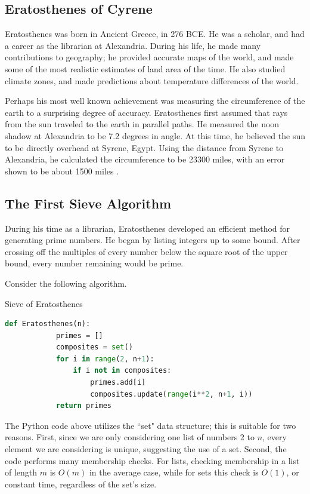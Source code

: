 \documentclass{amsart}
\theoremstyle{definition}
\theoremstyle{case}
\begin{document}
	\subsection{Eratosthenes of Cyrene}	
	Eratosthenes was born in Ancient Greece, in 276 BCE. He was a scholar, and had a career as the librarian at Alexandria. During his life, he made many contributions to geography; he provided accurate maps of the world, and made some of the most realistic estimates of land area of the time. He also studied climate zones, and made predictions about temperature differences of the world. 
	
	Perhaps his most well known achievement was measuring the circumference of the earth to a surprising degree of accuracy. Eratosthenes first assumed that rays from the sun traveled to the earth in parallel paths. He measured the noon shadow at Alexandria to be 7.2 degrees in angle. At this time, he believed the sun to be directly overhead at Syrene, Egypt. Using the distance from Syrene to Alexandria, he calculated the circumference to be 23300 miles, with an error shown to be about 1500 miles \cite{lawson2004}. 
	
	\subsection{The First Sieve Algorithm}
	
	During his time as a librarian, Eratosthenes developed an efficient method for generating prime numbers. He began by listing integers up to some bound. After crossing off the multiples of every number below the square root of the upper bound, every number remaining would be prime.
	
	Consider the following algorithm.
	
	\begin{Algorithm}[H]\caption{Sieve of Eratosthenes}
		\begin{lstlisting}[language=Python]
        def Eratosthenes(n):
            primes = []
            composites = set()
            for i in range(2, n+1):
                if i not in composites:
                    primes.add[i]
                    composites.update(range(i**2, n+1, i))
            return primes
        \end{lstlisting}
	\end{Algorithm}
	
	The Python code above utilizes the ``set" data structure; this is suitable for two reasons. First, since we are only considering one list of numbers 2 to $n$, every element we are considering is unique, suggesting the use of a set. Second, the code performs many membership checks. For lists, checking membership in a list of length $m$ is $O(m)$ in the average case, while for sets this check is $O(1)$, or constant time, regardless of the set's size.
	
\end{document}
